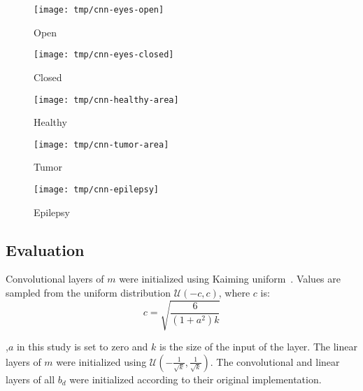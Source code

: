\documentclass[conference]{IEEEtran}
\begin{document}
\begin{figure*}[!t]
	\begin{subfigure}{0.19\linewidth}
		\centering
		\texttt{[image: tmp/cnn-eyes-open]}
		\caption{Open}
	\end{subfigure}
	\begin{subfigure}{0.19\linewidth}
		\centering
		\texttt{[image: tmp/cnn-eyes-closed]}
		\caption{Closed}
	\end{subfigure}
	\begin{subfigure}{0.19\linewidth}
		\centering
		\texttt{[image: tmp/cnn-healthy-area]}
		\caption{Healthy}
	\end{subfigure}
	\begin{subfigure}{0.19\linewidth}
		\centering
		\texttt{[image: tmp/cnn-tumor-area]}
		\caption{Tumor}
	\end{subfigure}
	\begin{subfigure}{0.19\linewidth}
		\centering
		\texttt{[image: tmp/cnn-epilepsy]}
		\caption{Epilepsy}
	\end{subfigure}
	\caption{Visualizations of the original signals and the outputs of the S2Is for each class.
	The x, y-axis of the first row are in \SI{}{\micro V} and time samples respectively.
	The x, y-axis of the rest of the subfigures denote spatial information, since we do not inform the `base model' the concept of time along the x-axis or the concept of frequency along the y-axis.
	Higher pixel intensity denotes higher amplitude.}
	\label{fig:signal2imageoutputs}
\end{figure*}

\subsection{Evaluation}
Convolutional layers of $m$ were initialized using Kaiming uniform~\cite{he2015delving}. Values are sampled from the uniform distribution $\mathcal{U}(-c, c)$, where $c$ is:
\begin{equation}
	c = \sqrt{\frac{6}{(1 + a^2) k}}
\end{equation}

\noindent
,$a$ in this study is set to zero and $k$ is the size of the input of the layer.
The linear layers of $m$ were initialized using $\mathcal{U}(-\frac{1}{\sqrt{k}},\frac{1}{\sqrt{k}})$.
The convolutional and linear layers of all $b_d$ were initialized according to their original implementation.
\end{document}
